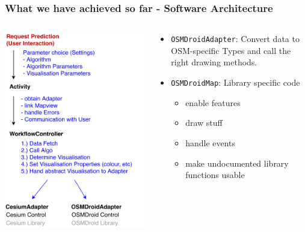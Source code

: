 \documentclass[xcolor=dvipsnames]{beamer}
\begin{document}
\begin{frame}
	\frametitle{What we have achieved so far - Software Architecture}
	\begin{columns}
	\begin{column}{0.5\textwidth}
		\includegraphics[width=\textwidth]{diagrams/controller-flow.pdf}
	\end{column}
	\begin{column}{0.5\textwidth}
		\fontsize{9pt}{7.2}\selectfont
		\begin{itemize}
		 	 \item \lstinline$OSMDroidAdapter$: Convert data to OSM-specific Types and call the right drawing methods.
		 	 \item \lstinline$OSMDroidMap$: Library specific code %
		 	 \begin{itemize}
		 	  	 \item enable features
		 	  	 \item draw stuff
		 	  	 \item handle events
		 	  	 \item make undocumented library functions usable
		 	 \end{itemize}
		\end{itemize}
 	\end{column}
	\end{columns}
\end{frame}
\end{document}

